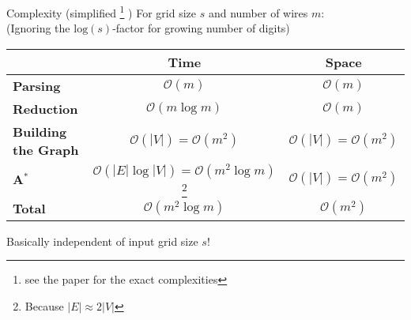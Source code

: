 \documentclass[aspectratio=169,xcolor=dvipsnames, t]{beamer}
\newcommand{\footnotestar}[1]{%
    \begingroup
    \renewcommand{\thefootnote}{\fnsymbol{footnote}}%
    \footnote{#1}%
    \endgroup
}
\begin{document}

\makefinalpage
\setcounter{framenumber}{10} %



\appendix
{}




\begin{frame}{Complexity (simplified\footnotestar{see the paper for the exact complexities})}
    For grid size $s$ and number of wires $m$:\\
    {\footnotesize(Ignoring the $\mathrm{log}(s)$-factor for growing number of digits)\\}

    \begin{table}[h!]
        \centering
        \begin{tabular}{|l|c|c|}
            \cline{2-3}
            \multicolumn{1}{c|}{}       & \textbf{Time}                       & \textbf{Space}                    \\ \hline
            \textbf{Parsing}            & $\mathcal O(m)$                     & $\mathcal O(m)$                   \\ \hline
            \textbf{Reduction}          & $\mathcal O(m\log m)$               & $\mathcal O(m)$                   \\ \hline
            \textbf{Building the Graph} & $\mathcal O(|V|)=\mathcal O(m^2)$   & $\mathcal O(|V|)=\mathcal O(m^2)$ \\ \hline
            \textbf{A$\mathbf{^*}$}     & $\mathcal O(|E|\log|V|)=\mathcal O(m^2\log m)$\footnotestar{Because $|E|\approx2|V|$}   & $\mathcal O(|V|)=\mathcal O(m^2)$ \\ \hline
            \hline
            \textbf{Total}              & $\mathcal O(m^2\log m)$             & $\mathcal O(m^2)$                 \\ \hline
        \end{tabular}
    \end{table}
    Basically independent of input grid size $s$!
\end{frame}
\end{document}
